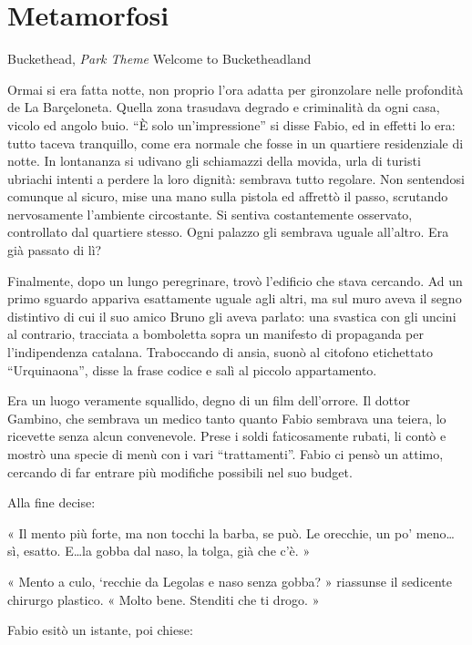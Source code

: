 \chapter{Metamorfosi}

\begin{chapquote}{Buckethead, \textit{Park Theme}}
	Welcome to Bucketheadland
\end{chapquote}

Ormai si era fatta notte, non proprio l'ora adatta per gironzolare nelle profondità de La Barçeloneta. Quella zona trasudava degrado e criminalità da ogni casa, vicolo ed angolo buio. ``È solo un'impressione'' si disse Fabio, ed in effetti lo era: tutto taceva tranquillo, come era normale che fosse in un quartiere residenziale di notte. In lontananza si udivano gli schiamazzi della movida, urla di turisti ubriachi intenti a perdere la loro dignità: sembrava tutto regolare. Non sentendosi comunque al sicuro, mise una mano sulla pistola ed affrettò il passo, scrutando nervosamente l'ambiente circostante. Si sentiva costantemente osservato, controllato dal quartiere stesso. Ogni palazzo gli sembrava uguale all'altro. Era già passato di lì?

Finalmente, dopo un lungo peregrinare, trovò l'edificio che stava cercando. Ad un primo sguardo appariva esattamente uguale agli altri, ma sul muro aveva il segno distintivo di cui il suo amico Bruno gli aveva parlato: una svastica con gli uncini al contrario, tracciata a bomboletta sopra un manifesto di propaganda per l'indipendenza catalana. Traboccando di ansia, suonò al citofono etichettato ``Urquinaona'', disse la frase codice e salì al piccolo appartamento.

Era un luogo veramente squallido, degno di un film dell'orrore. Il dottor Gambino, che sembrava un medico tanto quanto Fabio sembrava una teiera, lo ricevette senza alcun convenevole. Prese i soldi faticosamente rubati, li contò e mostrò una specie di menù con i vari ``trattamenti''. Fabio ci pensò un attimo, cercando di far entrare più modifiche possibili nel suo budget.

Alla fine decise:

« Il mento più forte, ma non tocchi la barba, se può. Le orecchie, un po' meno\ldots sì, esatto. E\ldots la gobba dal naso, la tolga, già che c'è. »

« Mento a culo,  `recchie da Legolas e naso senza gobba? » riassunse il sedicente chirurgo plastico. « Molto bene. Stenditi che ti drogo. »

Fabio esitò un istante, poi chiese:

